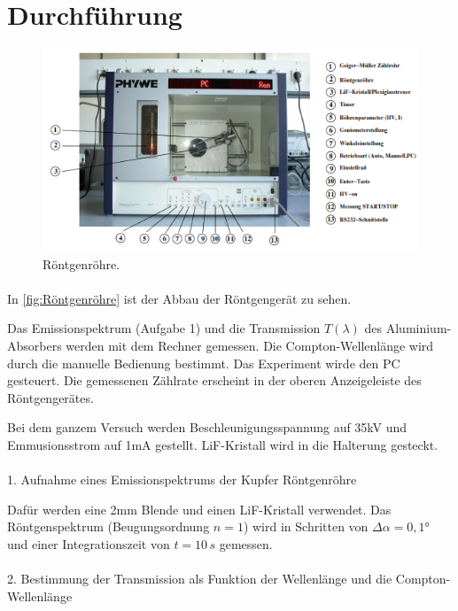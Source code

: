 \section{Durchführung}
\label{sec:Versuchsaufbau und Durchführung}
\begin{figure}[H]
    \centering
    \includegraphics{Röntgenröhre.png}
    \caption{Röntgenröhre.}
    \label{fig:Röntgenröhre}
  \end{figure} 
  \paragraph{}
In \autoref{fig:Röntgenröhre} ist der Abbau der Röntgengerät zu sehen. 

Das Emissionspektrum (Aufgabe 1) und die Transmission $T(\lambda)$ des Aluminium-Absorbers werden mit dem Rechner gemessen.
Die Compton-Wellenlänge wird durch die manuelle Bedienung bestimmt. 
Das Experiment wirde den PC gesteuert. 
Die gemessenen Zählrate erscheint in der oberen Anzeigeleiste des Röntgengerätes.

Bei dem ganzem Versuch werden Beschleunigungsspannung auf 35kV und Emmusionsstrom auf 1mA gestellt. LiF-Kristall wird in die Halterung gesteckt.
\paragraph{}
1. Aufnahme eines Emissionspektrums der Kupfer Röntgenröhre

Dafür werden eine 2mm Blende und einen LiF-Kristall verwendet. 
Das Röntgenspektrum (Beugungsordnung \(n=1 \)) wird in Schritten von \(\Delta\alpha=0,1° \) und einer Integrationszeit von  \(t=10 \,s \) gemessen.
\paragraph{}
2. Bestimmung der Transmission als Funktion der Wellenlänge und die Compton-Wellenlänge

